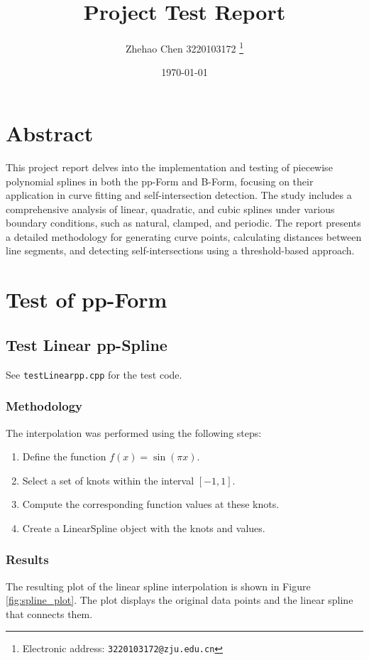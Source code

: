 \documentclass{article}
\title{\textbf{Project Test Report}}
\author{Zhehao Chen 3220103172
  \thanks{Electronic address: \texttt{3220103172@zju.edu.cn}}}
\date{\today}
\begin{document}
\maketitle

\section*{Abstract}
This project report delves into the implementation and testing of piecewise polynomial splines in both the pp-Form and B-Form, focusing on their application in curve fitting and self-intersection detection. The study includes a comprehensive analysis of linear, quadratic, and cubic splines under various boundary conditions, such as natural, clamped, and periodic. The report presents a detailed methodology for generating curve points, calculating distances between line segments, and detecting self-intersections using a threshold-based approach.

\tableofcontents
\clearpage

\section{Test of pp-Form}

\subsection{Test Linear pp-Spline}
See \texttt{testLinearpp.cpp} for the test code.
\subsubsection{Methodology}
The interpolation was performed using the following steps:
\begin{enumerate}
    \item Define the function $f(x) = \sin(\pi x)$.
    \item Select a set of knots within the interval \([-1, 1]\).
    \item Compute the corresponding function values at these knots.
    \item Create a LinearSpline object with the knots and values.
\end{enumerate}

\subsubsection{Results}
The resulting plot of the linear spline interpolation is shown in Figure \ref{fig:spline_plot}. The plot displays the original data points and the linear spline that connects them.
\end{document}
